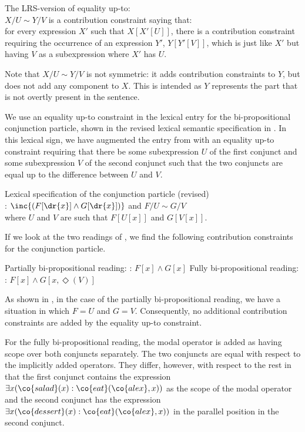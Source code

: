 \documentclass[output=paper]{langsci/langscibook}
\begin{document}
\ea
The LRS-version of equality up-to:\\
$X/U \sim Y/V$ is a contribution constraint saying that:\\
for every expression $X'$ such that $X[X'[U]]$, there is a contribution constraint requiring the occurrence of an expression $Y'$,  $Y[Y'[V]]$,  which is just like $X'$ but having $V$ as a subexpression where $X'$ has $U$.
\z 

Note that $X/U\sim Y/V$ is not symmetric: it adds contribution constraints to $Y$, but does not add any component to $X$. 
This is intended as $Y$ represents the part that is not overtly present in the sentence.

We use an equality up-to constraint in the lexical entry for the bi-propositional conjunction particle, 
shown in the revised lexical semantic specification in . 
In this lexical sign, we have augmented the entry from  with an equality up-to constraint requiring that there be some subexpression $U$ of the first conjunct and some subexpression $V$ of the second conjunct such that the two conjuncts are equal up to the difference between $U$ and $V$.

\ea Lexical specification of the conjunction particle (revised)\label{le-biprop-and-Pinkal}
\label{le-und1-Pinkal}
\\
: $\inc{(F[\dr{x}] \land G[\dr{x}])}$ and $F/U\sim G/V$\\
where $U$ and $V$ are such that
$F[U[x]]$ and $G[V[x]]$.
\z 

If we look at the two readings of , we find the following contribution constraints for the conjunction particle. 

\ea \label{constr-notAND-bi}
\begin{xlist}
\ex Partially bi-propositional reading: 
: $F[x] \land G[x]$
\ex Fully bi-propositional reading: 
: $F[x] \land G[x, \Diamond(V)]$
\end{xlist}
\z

As shown in , in the case of the partially bi-propositional reading, we have a situation in which $F=U$ and $G=V$. Consequently, no additional contribution constraints are added by the equality up-to constraint. 

For the fully bi-propositional reading, the modal operator is added as having scope over both conjuncts separately. 
The two conjuncts are equal with respect to the implicitly added operators. They differ, however, with respect to the rest in that 
the first conjunct contains the expression $\exists x (\co{salad}(x) : \co{eat}(\co{alex},x))$ as the scope of the modal operator and the second conjunct has the expression $\exists x (\co{dessert}(x) : \co{eat}(\co{alex},x))$ in the parallel position in the second conjunct.
\end{document}
